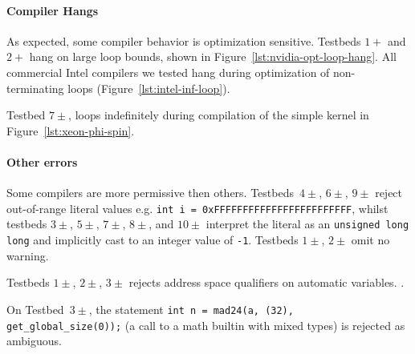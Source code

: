 \paragraph{Compiler Hangs} %
As expected, some compiler behavior is optimization sensitive. Testbeds $1+$ and $2+$ hang on large loop bounds, shown in Figure~\ref{lst:nvidia-opt-loop-hang}. All commercial Intel compilers we tested hang during optimization of non-terminating loops (Figure~\ref{lst:intel-inf-loop}).

Testbed $7\pm$, loops indefinitely during compilation of the simple kernel in Figure~\ref{lst:xeon-phi-spin}.

\paragraph{Other errors} %

Some compilers are more permissive then others. Testbeds~$4\pm$, $6\pm$, $9\pm$ reject out-of-range literal values e.g. \texttt{int i = 0xFFFFFFFFFFFFFFFFFFFFFFFF}, whilst testbeds $3\pm$, $5\pm$, $7\pm$, $8\pm$, and $10\pm$ interpret the literal as an \texttt{unsigned long long} and implicitly cast to an integer value of \texttt{-1}. Testbeds $1\pm$, $2\pm$ omit no warning.

Testbeds $1\pm$, $2\pm$, $3\pm$ rejects address space qualifiers on automatic variables. .

On Testbed~$3\pm$, the statement \texttt{int n = mad24(a, (32), get\_global\_size(0));} (a call to a math builtin with mixed types) is rejected as ambiguous.


%
%


